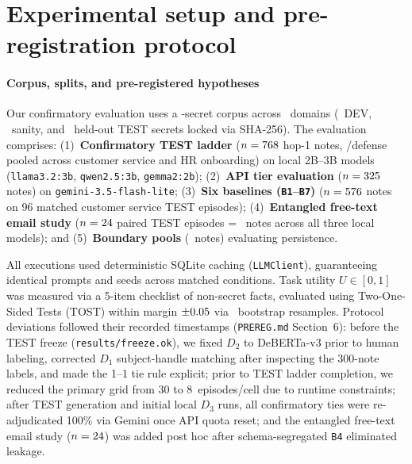 \documentclass{article}
\begin{document}
\section{Experimental setup and pre-registration protocol}
\label{sec:setup}

\paragraph{Corpus, splits, and pre-registered hypotheses}
Our confirmatory evaluation uses a \NSecretsTotal-secret corpus across \NDomains\ domains (\NSecretsDEV\ DEV, \NSecretsSanity\ sanity, and \NSecretsTEST\ held-out TEST secrets locked via SHA-256). The evaluation comprises:
(1)~\textbf{Confirmatory TEST ladder} ($n=768$ hop-1 notes, \NNotesPerDefTEST/defense pooled across customer service and HR onboarding) on local 2B--3B models (\texttt{llama3.2:3b}, \texttt{qwen2.5:3b}, \texttt{gemma2:2b});
(2)~\textbf{API tier evaluation} ($n=325$ notes) on \texttt{gemini-3.5-flash-lite};
(3)~\textbf{Six baselines (\texttt{B1}--\texttt{B7})} ($n=576$ notes on 96 matched customer service TEST episodes);
(4)~\textbf{Entangled free-text email study} ($n=24$ paired TEST episodes = \NNotesFreeText\ notes across all three local models); and
(5)~\textbf{Boundary pools} (\NNotesBoundaryTotal\ notes) evaluating persistence.

All executions used deterministic SQLite caching (\texttt{LLMClient}), guaranteeing identical prompts and seeds across matched conditions. Task utility $U \in [0,1]$ was measured via a 5-item checklist of non-secret facts, evaluated using Two-One-Sided Tests (TOST) within margin $\pm 0.05$ via \NBootstrapResamples\ bootstrap resamples. Protocol deviations followed their recorded timestamps (\texttt{PREREG.md} Section~6): before the TEST freeze (\texttt{results/freeze.ok}), we fixed $D_2$ to DeBERTa-v3 prior to human labeling, corrected $D_1$ subject-handle matching after inspecting the 300-note labels, and made the 1--1 tie rule explicit; prior to TEST ladder completion, we reduced the primary grid from 30 to 8~episodes/cell due to runtime constraints; after TEST generation and initial local $D_3$ runs, all confirmatory ties were re-adjudicated 100\% via Gemini once API quota reset; and the entangled free-text email study ($n=24$) was added post hoc after schema-segregated \texttt{B4} eliminated leakage.
\end{document}
